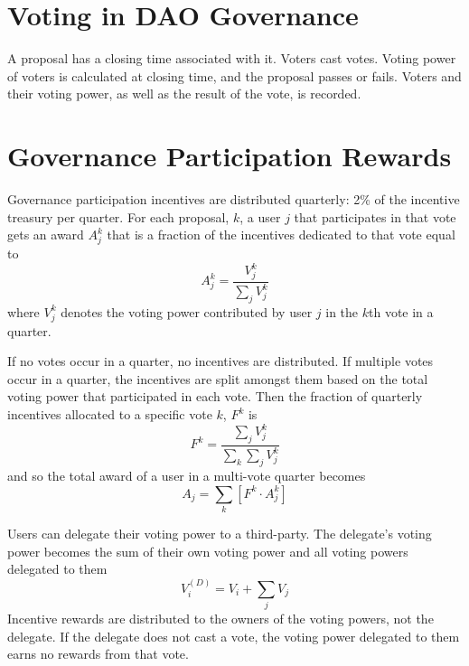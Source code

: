 \documentclass{article}
\begin{document}
\section{Voting in DAO Governance}\label{sec:voting}

A proposal has a closing time associated with it.
Voters cast votes.
Voting power of voters is calculated at closing time, and the proposal passes or fails.
Voters and their voting power, as well as the result of the vote, is recorded.

\section{Governance Participation Rewards}\label{sec:rewards}

Governance participation incentives are distributed quarterly: 2\% of the incentive treasury per quarter.
For each proposal, $k$, a user $j$ that participates in that vote gets an award $A^{k}_j$ that is a fraction of the incentives dedicated to that vote equal to
\begin{equation}
A^{k}_j = \frac{V^{k}_j}{\sum_j V^{k}_j}
\end{equation}
where $V^{k}_j$ denotes the voting power contributed by user $j$ in the $k$th vote in a quarter.

If no votes occur in a quarter, no incentives are distributed.
If multiple votes occur in a quarter, the incentives are split amongst them based on the total voting power that participated in each vote.
Then the fraction of quarterly incentives allocated to a specific vote $k$, $F^{k}$ is
\begin{equation}
F^{k} = \frac{\sum_j V^{k}_j}{\sum_k \sum_j V^{k}_j}
\end{equation}
and so the total award of a user in a multi-vote quarter becomes
\begin{equation}
A_j = \sum_k \left[F^{k} \cdot A^{k}_j\right]
\end{equation}

Users can delegate their voting power to a third-party.
The delegate's voting power becomes the sum of their own voting power and all voting powers delegated to them
\begin{equation}
V^{(D)}_i = V_i + \sum_j V_j
\end{equation}
Incentive rewards are distributed to the owners of the voting powers, not the delegate.
If the delegate does not cast a vote, the voting power delegated to them earns no rewards from that vote.
\end{document}
